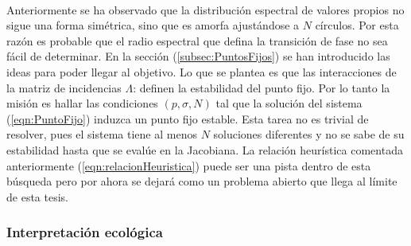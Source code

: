 \\
Anteriormente se ha observado que la distribución espectral de valores propios no sigue una forma simétrica, sino que es amorfa ajustándose a $N$ círculos. Por esta razón es probable que el radio espectral que defina la transición de fase no sea fácil de determinar. En la sección (\ref{subsec:PuntosFijos}) se han introducido las ideas para poder llegar al objetivo. Lo que se plantea es que las interacciones de la matriz de incidencias $\Lambda$: definen la estabilidad del punto fijo. Por lo tanto la misión es hallar las condiciones $(p,\sigma,N)$ tal que la solución del sistema (\ref{eqn:PuntoFijo}) induzca un punto fijo estable. Esta tarea no es trivial de resolver, pues el sistema tiene al menos $N$ soluciones diferentes y no se sabe de su estabilidad hasta que se evalúe en la Jacobiana. La relación heurística comentada anteriormente (\ref{eqn:relacionHeuristica}) puede ser una pista dentro de esta búsqueda pero por ahora se dejará como un problema abierto que llega al límite de esta tesis.
\newpage
\subsubsection*{Interpretación ecológica}

